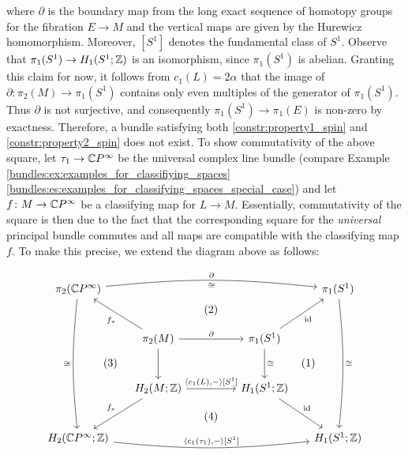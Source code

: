 where $\partial$ is the boundary map from the long exact sequence of homotopy groups for the fibration $E \to M$ and the vertical maps are given by the Hurewicz homomorphism. Moreover, $[S^1]$ denotes the fundamental class of $S^1$. Observe that $\pi_1(S^1) \to H_1(S^1;\mathbb{Z})$ is an isomorphism, since $\pi_1(S^1)$ is abelian. Granting this claim for now, it follows from $c_1(L) = 2\alpha$ that the image of $\partial \colon \pi_2(M) \to \pi_1(S^1)$ contains only even multiples of the generator of $\pi_1(S^1)$. Thus $\partial$ is not surjective, and consequently $\pi_1(S^1) \to \pi_1(E)$ is non-zero by exactness. Therefore, a bundle satisfying both \ref{constr:property1_spin} and \ref{constr:property2_spin} does not exist. To show commutativity of the above square, let $\tau_1 \to \mathbb{C} P^\infty$ be the universal complex line bundle (compare Example \ref{bundles:ex:examples_for_classifiying_spaces} \ref{bundles:es:examples_for_classifying_spaces_special_case}) and let $f \colon M \to \mathbb{C} P^\infty$ be a classifying map for $L \to M$. Essentially, commutativity of the square is then due to the fact that the corresponding square for the \emph{universal} principal bundle commutes and all maps are compatible with the classifying map $f$. To make this precise, we extend the diagram above as follows: 

\vspace{0.5\baselineskip}
\[\begin{tikzcd}[column sep=1.5em,row sep=large, execute at end picture={
  \node at (3.3,0) {$(1)$};
  \node at (-3,0) {$(3)$};
  \node at (0.2,1.7) {$(2)$};
  \node at (0.2,-1.7) {$(4)$};
}]
	{\pi_2(\CP^\infty)} &&&&& {\pi_1(S^1)} \\
	& {\pi_2(M)} &&& {\pi_1(S^1)} \\
	& {H_2(M;\Z)} &&& {H_1(S^1;\Z)} \\
	{H_2(\CP^\infty;\Z)} &&&&& {H_1(S^1;\Z)}
	\arrow["\partial", "\cong"', bend left = 6, from=1-1, to=1-6]
	\arrow["\cong"', bend right = 6, from=1-1, to=4-1]
	\arrow["\cong", bend left = 6, from=1-6, to=4-6]
	\arrow["{f_\ast}", from=2-2, to=1-1]
	\arrow["\partial", from=2-2, to=2-5]
	\arrow[from=2-2, to=3-2]
	\arrow["{\mathrm{id}}"', from=2-5, to=1-6]
	\arrow["\cong", from=2-5, to=3-5]
	\arrow["{\langle c_1(L),-\rangle [S^1]}", from=3-2, to=3-5]
	\arrow["{f_\ast}"', from=3-2, to=4-1]
	\arrow["{\mathrm{id}}", from=3-5, to=4-6]
	\arrow["{\langle c_1(\tau_1),-\rangle [S^1]}", bend right = 6, from=4-1, to=4-6]
\end{tikzcd}\]
\vspace{\baselineskip}

